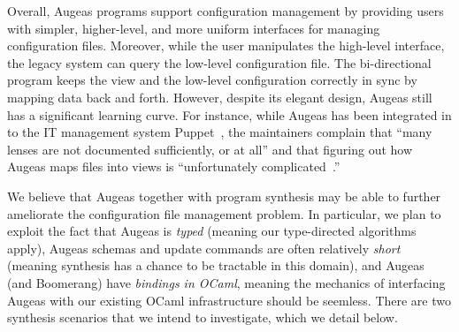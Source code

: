 
Overall, Augeas programs support configuration management
by providing users with simpler, higher-level, and
more uniform interfaces for managing configuration files.  
Moreover, while the user manipulates the high-level interface,
the legacy system can query the low-level configuration file.
The bi-directional program keeps the view and the low-level configuration 
correctly in sync by mapping data back and forth.
However, despite its elegant design, Augeas still has a significant learning curve.
For instance, while Augeas has been integrated in to the IT management
system Puppet~\cite{puppet},
the maintainers complain that ``many lenses are not documented sufficiently, or at all'' and that figuring out how Augeas maps files into
views is ``unfortunately complicated~\cite{augeas-complicated}.''

We believe that Augeas together with program synthesis may be 
able to further ameliorate the configuration file management problem.
In particular, we plan to exploit the fact that Augeas is \emph{typed}
(meaning our type-directed algorithms apply), Augeas schemas and
update commands are often relatively \emph{short} (meaning synthesis has a
chance to be tractable in this domain), and Augeas (and Boomerang)
have \emph{bindings in OCaml}, meaning the mechanics of interfacing
Augeas with our existing OCaml infrastructure should be seemless.
There are two synthesis scenarios that we intend to investigate, which
we detail below.

